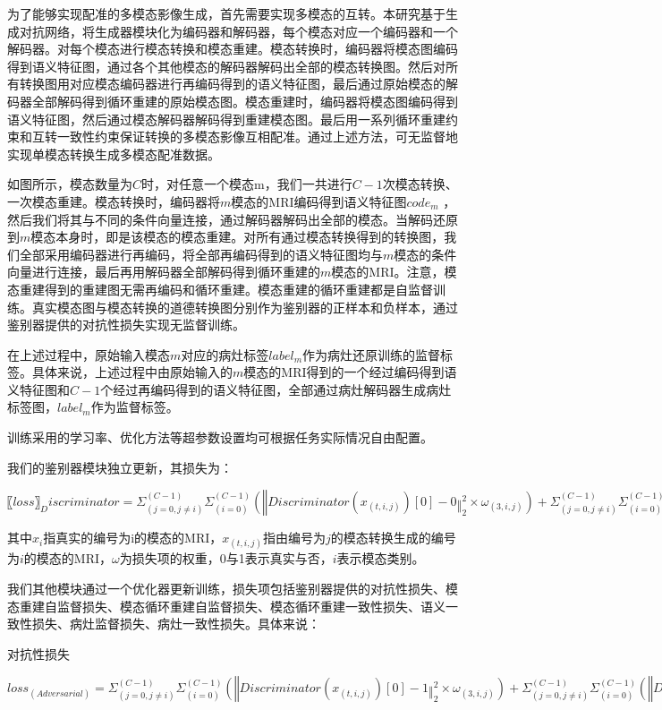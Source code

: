 \documentclass[letterpaper]{article} %
\begin{document}
为了能够实现配准的多模态影像生成，首先需要实现多模态的互转。本研究基于生成对抗网络，将生成器模块化为编码器和解码器，每个模态对应一个编码器和一个解码器。对每个模态进行模态转换和模态重建。模态转换时，编码器将模态图编码得到语义特征图，通过各个其他模态的解码器解码出全部的模态转换图。然后对所有转换图用对应模态编码器进行再编码得到的语义特征图，最后通过原始模态的解码器全部解码得到循环重建的原始模态图。模态重建时，编码器将模态图编码得到语义特征图，然后通过模态解码器解码得到重建模态图。最后用一系列循环重建约束和互转一致性约束保证转换的多模态影像互相配准。通过上述方法，可无监督地实现单模态转换生成多模态配准数据。

如图所示，模态数量为$C$时，对任意一个模态m，我们一共进行$C-1$次模态转换、一次模态重建。模态转换时，编码器将$m$模态的MRI编码得到语义特征图$code_m$ ，然后我们将其与不同的条件向量连接，通过解码器解码出全部的模态。当解码还原到$m$模态本身时，即是该模态的模态重建。对所有通过模态转换得到的转换图，我们全部采用编码器进行再编码，将全部再编码得到的语义特征图均与$m$模态的条件向量进行连接，最后再用解码器全部解码得到循环重建的$m$模态的MRI。注意，模态重建得到的重建图无需再编码和循环重建。模态重建的循环重建都是自监督训练。真实模态图与模态转换的道德转换图分别作为鉴别器的正样本和负样本，通过鉴别器提供的对抗性损失实现无监督训练。

在上述过程中，原始输入模态$m$对应的病灶标签$label_m$作为病灶还原训练的监督标签。具体来说，上述过程中由原始输入的$m$模态的MRI得到的一个经过编码得到语义特征图和$C-1$个经过再编码得到的语义特征图，全部通过病灶解码器生成病灶标签图，$label_m$作为监督标签。

训练采用的学习率、优化方法等超参数设置均可根据任务实际情况自由配置。

我们的鉴别器模块独立更新，其损失为：

$〖loss〗_Discriminator=Σ_(j=0,j≠i)^(C-1) Σ_(i=0)^(C-1) (‖Discriminator(x_(t,i,j) )[0]-0‖_2^2×ω_(3,i,j))+Σ_(j=0,j≠i)^(C-1) Σ_(i=0)^(C-1) (‖Discriminator(x_(t,i,j) )[1]-i‖_2^2×ω_(4,i,j))$

其中$x_i$指真实的编号为i的模态的MRI，$x_(t,i,j)$指由编号为$j$的模态转换生成的编号为$i$的模态的MRI，$ω$为损失项的权重，0与1表示真实与否，$i$表示模态类别。

我们其他模块通过一个优化器更新训练，损失项包括鉴别器提供的对抗性损失、模态重建自监督损失、模态循环重建自监督损失、模态循环重建一致性损失、语义一致性损失、病灶监督损失、病灶一致性损失。具体来说：

对抗性损失

$loss_(Adversarial )=Σ_(j=0,j≠i)^(C-1) Σ_(i=0)^(C-1) (‖Discriminator(x_(t,i,j) )[0]-1‖_2^2×ω_(3,i,j))+Σ_(j=0,j≠i)^(C-1) Σ_(i=0)^(C-1) (‖Discriminator(x_(t,i,j) )[1]-i‖_2^2×ω_(4,i,j))$
\end{document}
